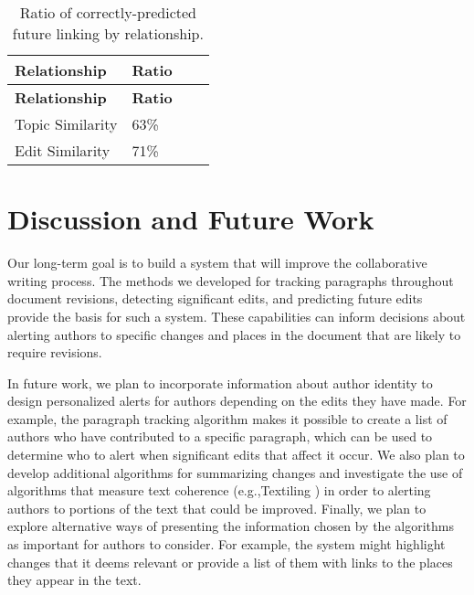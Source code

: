 \begin{longtable}[c]{@{}llll@{}}
\caption{Ratio of correctly-predicted future linking by
relationship.{}}\tabularnewline
\toprule
\textbf{Relationship} & \textbf{Ratio} & &\tabularnewline
\midrule
\endfirsthead
\toprule
\textbf{Relationship} & \textbf{Ratio} & &\tabularnewline
\midrule
\endhead
Topic Similarity & 63\% & &\tabularnewline
Edit Similarity & 71\% & &\tabularnewline
\bottomrule
\end{longtable}

\section{Discussion and Future Work}\label{discussion-and-future-work}

Our long-term goal is to build a system that will improve the
collaborative writing process. The methods we developed for tracking
paragraphs throughout document revisions, detecting significant edits,
and predicting future edits provide the basis for such a system. These
capabilities can inform decisions about alerting authors to specific
changes and places in the document that are likely to require revisions.

In future work, we plan to incorporate information about author identity
to design personalized alerts for authors depending on the edits they
have made. For example, the paragraph tracking algorithm makes it
possible to create a list of authors who have contributed to a specific
paragraph, which can be used to determine who to alert when significant
edits that affect it occur. We also plan to develop additional
algorithms for summarizing changes and investigate the use of algorithms
that measure text coherence (e.g.,Textiling \cite{hearst1994multi}) in
order to alerting authors to portions of the text that could be
improved. Finally, we plan to explore alternative ways of presenting the
information chosen by the algorithms as important for authors to
consider. For example, the system might highlight changes that it deems
relevant or provide a list of them with links to the places they appear
in the text.

